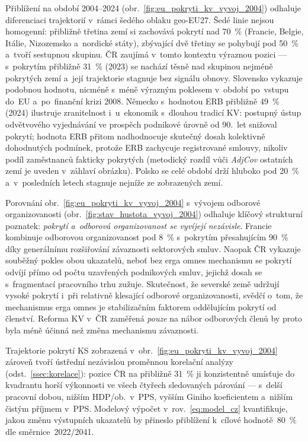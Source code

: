 Přiblížení na období 2004--2024 (obr.~\ref{fig:eu_pokryti_kv_vyvoj_2004})
odhaluje diferenciaci trajektorií v~rámci šedého oblaku \acs{geo-EU27}.
Šedé linie nejsou homogenní: přibližně třetina zemí si zachovává pokrytí
nad \SI{70}{\percent} (Francie, Belgie, Itálie, Nizozemsko a~nordické státy), zbývající dvě třetiny
se pohybují pod \SI{50}{\percent} a~tvoří sestupnou skupinu.
ČR zaujímá v~tomto kontextu výraznou pozici --- s~pokrytím přibližně
\SI{31}{\percent} (2023) se nachází těsně nad skupinou nejméně pokrytých zemí
a~její trajektorie stagnuje bez signálu obnovy.
Slovensko vykazuje podobnou hodnotu, nicméně s~méně výrazným poklesem
v~období po~vstupu do~\ac{EU} a~po~finanční krizi 2008.
Německo s~hodnotou ERB přibližně \SI{49}{\percent} (2024) ilustruje
zranitelnost i~u~ekonomik s~dlouhou tradicí \ac{KV}: postupný ústup
odvětvového vyjednávání ve prospěch podnikové úrovně od 90.~let snižoval
pokrytí; hodnota ERB přitom nadhodnocuje skutečný dosah kolektivně dohodnutých
podmínek, protože ERB zachycuje registrované smlouvy, nikoliv podíl
zaměstnanců fakticky pokrytých (metodický rozdíl vůči \textit{AdjCov} ostatních
zemí je uveden v~záhlaví obrázku).
Polsko se celé období drží hluboko pod \SI{20}{\percent} a~v~posledních
letech stagnuje nejníže ze zobrazených zemí.



Porovnání obr.~\ref{fig:eu_pokryti_kv_vyvoj_2004} s~vývojem odborové organizovanosti
(obr.~\ref{fig:stav_hustota_vyvoj_2004}) odhaluje klíčový strukturní poznatek:
\emph{pokrytí a~odborová organizovanost se vyvíjejí nezávisle}.
Francie kombinuje odborovou organizovanost pod \SI{8}{\percent} s~pokrytím přesahujícím
\SI{90}{\percent} díky generálnímu rozšiřování závaznosti sektorových smluv.
Naopak ČR vykazuje souběžný pokles obou ukazatelů, neboť bez erga omnes
mechanismu se pokrytí odvíjí přímo od počtu uzavřených podnikových smluv,
jejichž dosah se s~fragmentací pracovního trhu zužuje.
Skutečnost, že severské země udržují vysoké pokrytí i~při relativně klesající
odborové organizovanosti, svědčí o~tom, že mechanismus erga omnes je
stabilizačním faktorem oddělujícím pokrytí od členství.
Reforma \ac{KV} v~ČR zaměřená \emph{pouze} na nábor odborových členů by proto
byla méně účinná než změna mechanismu závaznosti.

Trajektorie pokrytí \ac{KS} zobrazená v~obr.~\ref{fig:eu_pokryti_kv_vyvoj_2004}
zároveň tvoří ústřední nezávislou proměnnou korelační analýzy
(odst.~\ref{ssec:korelace}): pozice ČR na přibližně \SI{31}{\percent} ji
konzistentně umísťuje do kvadrantu horší výkonnosti ve všech čtyřech
sledovaných párování --- s~delší pracovní dobou, nižším HDP/ob.~v~PPS,
vyšším Giniho koeficientem a~nižším čistým příjmem v~PPS.
Modelový výpočet v~rov.~\eqref{eq:model_cz} kvantifikuje, jakou změnu
výstupních ukazatelů by přineslo přiblížení k~cílové hodnotě~\SI{80}{\percent}
dle směrnice~2022/2041.
